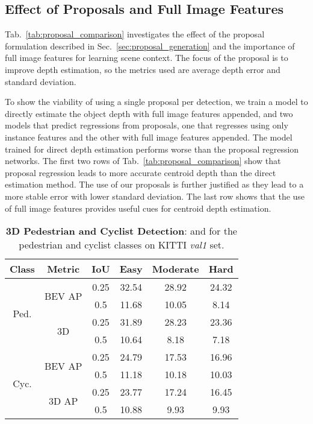 \documentclass[10pt,twocolumn,letterpaper]{article}
\begin{document}
	\subsection{Effect of Proposals and Full Image Features} \label{sec:proposal_comparison}
	Tab.~\ref{tab:proposal_comparison} investigates the effect of the proposal formulation described in Sec.~\ref{sec:proposal_generation} and the importance of full image features for learning scene context. The focus of the proposal is to improve depth estimation, so the metrics used are average depth error and standard deviation.
	
	To show the viability of using a single proposal per detection, we train a model to directly estimate the object depth with full image features appended, and two models that predict regressions from proposals, one that regresses using only instance features and the other with full image features appended. The model trained for direct depth estimation performs worse than the proposal regression networks. The first two rows of Tab.~\ref{tab:proposal_comparison} show that proposal regression leads to more accurate centroid depth than the direct estimation method. The use of our proposals is further justified as they lead to a more stable error with lower standard deviation. The last row shows that the use of full image features provides useful cues for centroid depth estimation.

	\begin{table}[t!]
		\small
		\centering
		\begin{tabular}{|c|c|c||ccc|}
			\hline
			Class & Metric & IoU & Easy & Moderate & Hard\\
			\hline
			\multirow{4}{*}{Ped.} & \multirow{2}{*}{BEV AP} & 0.25 & 32.54 & 28.92 & 24.32 \\
			& & 0.5   & 11.68 & 10.05 & 8.14 \\ \cline{2-6}
			& \multirow{2}{*}{3D}     & 0.25 & 31.89 & 28.23 & 23.36 \\ 
			& & 0.5   & 10.64 & 8.18 & 7.18 \\ \hline
			\multirow{4}{*}{Cyc.} & \multirow{2}{*}{BEV AP} & 0.25 & 24.79 & 17.53 & 16.96 \\
			& & 0.5   & 11.18 & 10.18 & 10.03 \\ \cline{2-6}
			& \multirow{2}{*}{3D AP}  & 0.25 & 23.77 & 17.24 & 16.45 \\
			& & 0.5   & 10.88 & 9.93 & 9.93 \\ \hline 
			
		\end{tabular}
		\caption{\textbf{3D Pedestrian and Cyclist Detection}: \emph{} and \emph{} for the pedestrian and cyclist classes on KITTI \emph{val1} set.}
		\label{tab:kitti_val_ped_cyc}
	\end{table}
	
\end{document}
